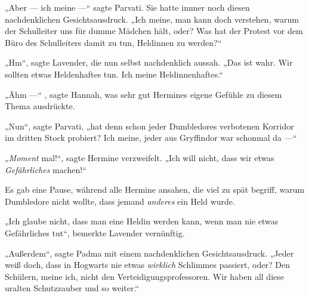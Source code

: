 „Aber — ich meine —“ sagte Parvati. Sie hatte immer noch diesen nachdenklichen Gesichtsausdruck.
„Ich meine, man kann doch verstehen, warum der Schulleiter uns für dumme Mädchen hält, oder? Was hat der Protest vor dem Büro des Schulleiters damit zu tun, Heldinnen zu werden?“

„Hm“, sagte Lavender, die nun selbst nachdenklich aussah.
„Das ist wahr. Wir sollten etwas Heldenhaftes tun. Ich meine Heldinnenhaftes.“

„Ähm —“ , sagte Hannah, was sehr gut Hermines eigene Gefühle zu diesem Thema ausdrückte.

„Nun“, sagte Parvati, „hat denn schon jeder Dumbledores verbotenen Korridor im dritten Stock probiert? Ich meine, jeder aus Gryffindor war schonmal da —“

„\emph{Moment} mal!“, sagte Hermine verzweifelt.
„Ich will nicht, dass wir etwas \emph{Gefährliches} machen!“

Es gab eine Pause, während alle Hermine ansahen, die viel zu spät begriff, warum Dumbledore nicht wollte, dass jemand \emph{anderes} ein Held wurde.

„Ich glaube nicht, dass man eine Heldin werden kann, wenn man nie etwas Gefährliches tut“, bemerkte Lavender vernünftig.

„Außerdem“, sagte Padma mit einem nachdenklichen Gesichtsausdruck.
„Jeder weiß doch, dass in Hogwarts nie etwas \emph{wirklich} Schlimmes passiert, oder? Den Schülern, meine ich, nicht den Verteidigungsprofessoren. Wir haben all diese uralten Schutzzauber und so weiter.“

